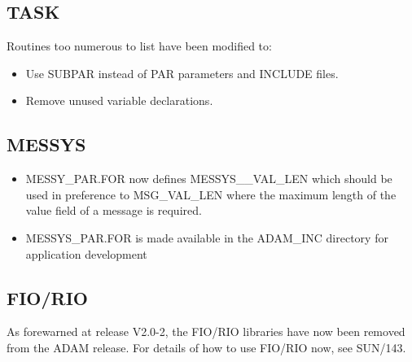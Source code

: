 \subsection{TASK}
Routines too numerous to list have been modified to:
\begin{itemize}
\item Use SUBPAR instead of PAR parameters and INCLUDE files.
\item Remove unused variable declarations.
\end{itemize}

\subsection{MESSYS}
\begin{itemize}
\item MESSY\_PAR.FOR now defines MESSYS\_\_VAL\_LEN which should be used in
preference to MSG\_VAL\_LEN where the maximum length of the value field of a
message is required.
\item MESSYS\_PAR.FOR is made available in the ADAM\_INC directory for
application development
\end{itemize}

\subsection{FIO/RIO}
As forewarned at release V2.0-2, the FIO/RIO libraries have now been removed
from the ADAM release.
For details of how to use FIO/RIO now, see SUN/143.


